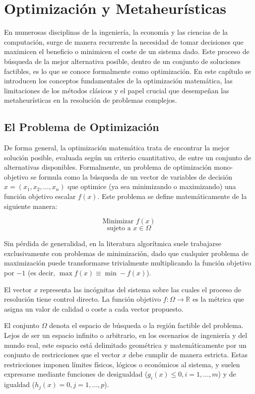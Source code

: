 \documentclass[12pt,a4paper,twoside,openright]{book}
\begin{document}
\chapter{Optimización y Metaheurísticas}

    En numerosas disciplinas de la ingeniería, la economía y las ciencias de la computación, surge de manera recurrente la necesidad de tomar decisiones que maximicen el beneficio o minimicen el coste de un sistema dado. Este proceso de búsqueda de la mejor alternativa posible, dentro de un conjunto de soluciones factibles, es lo que se conoce formalmente como optimización. En este capítulo se introducen los conceptos fundamentales de la optimización matemática, las limitaciones de los métodos clásicos y el papel crucial que desempeñan las metaheurísticas en la resolución de problemas complejos.

\section{El Problema de Optimización}

    De forma general, la optimización matemática trata de encontrar la mejor solución posible, evaluada según un criterio cuantitativo, de entre un conjunto de alternativas disponibles. Formalmente, un problema de optimización mono-objetivo se formula como la búsqueda de un vector de variables de decisión $x = (x_1, x_2, \dots, x_n)$ que optimice (ya sea minimizando o maximizando) una función objetivo escalar $f(x)$. Este problema se define matemáticamente de la siguiente manera:

    $$ \text{Minimizar } f(x) $$
    $$ \text{sujeto a } x \in \Omega $$

    Sin pérdida de generalidad, en la literatura algorítmica suele trabajarse exclusivamente con problemas de minimización, dado que cualquier problema de maximización puede transformarse trivialmente multiplicando la función objetivo por $-1$ (es decir, $\max f(x) \equiv \min -f(x)$).

    El vector $x$ representa las incógnitas del sistema sobre las cuales el proceso de resolución tiene control directo. La función objetivo $f: \Omega \to \mathbb{R}$ es la métrica que asigna un valor de calidad o coste a cada vector propuesto. 

    El conjunto $\Omega$ denota el espacio de búsqueda o la región factible del problema. Lejos de ser un espacio infinito o arbitrario, en los escenarios de ingeniería y del mundo real, este espacio está delimitado geométrica y matemáticamente por un conjunto de restricciones que el vector $x$ debe cumplir de manera estricta. Estas restricciones imponen límites físicos, lógicos o económicos al sistema, y suelen expresarse mediante funciones de desigualdad ($g_i(x) \leq 0, i = 1, \dots, m$) y de igualdad ($h_j(x) = 0, j = 1, \dots, p$). 
\end{document}
